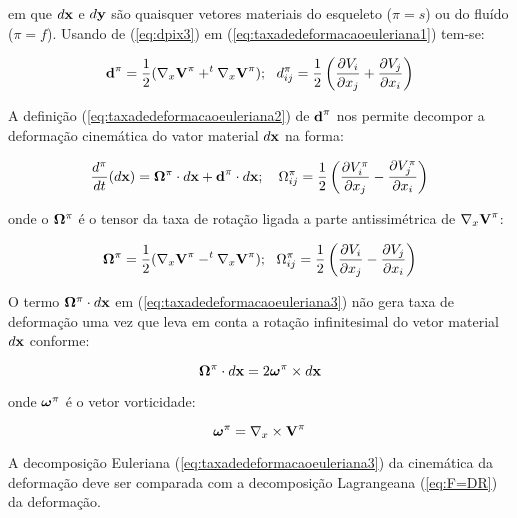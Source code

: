 \documentclass[
	11pt, %
	fleqn, %
	a4paper, %
]{LegrandOrangeBook}
\begin{document}
em que $d\textbf{x}$ e $d\textbf{y}$ são quaisquer vetores materiais do esqueleto ($\pi = s$) ou do fluído ($\pi = f$). Usando de (\ref{eq:dpix3}) em (\ref{eq:taxadedeformacaoeuleriana1}) tem-se: 

\begin{equation}
	\label{eq:taxadedeformacaoeuleriana2}	
\textbf{d}^{\pi} = \dfrac{1}{2}(\nabla_x \textbf{V}^{\pi} + ^{t}\nabla_x \textbf{V}^{\pi}); ~~ d^\pi_{ij} =  \dfrac{1}{2} \left(\dfrac{\partial V_i}{\partial x_j} + \dfrac{\partial V_j}{\partial x_i}\right)
\end{equation}

A definição (\ref{eq:taxadedeformacaoeuleriana2}) de $\textbf{d}^{\pi}$ nos permite decompor a deformação cinemática do vator material $d\textbf{x}$ na forma:

\begin{equation}
	\label{eq:taxadedeformacaoeuleriana3}	
	\dfrac{d^\pi}{dt}(d\textbf{x}) = \bm{\Omega}^\pi \cdot d\textbf{x} + \textbf{d}^\pi \cdot d\textbf{x}; ~~~ \Omega^\pi_{ij} = \dfrac{1}{2}\left(\dfrac{\partial V_i^\pi}{\partial x_j}-\dfrac{\partial V_j^\pi}{\partial x_i} \right)
\end{equation}

onde o $\bm{\Omega}^\pi$ é o tensor da taxa de rotação ligada a parte antissimétrica de $\nabla_x \textbf{V}^\pi$:

\begin{equation}
	\label{eq:taxadedeformacaoeuleriana4}	
\bm{\Omega}^\pi = \dfrac{1}{2}(\nabla_x \textbf{V}^{\pi} - ^{t}\nabla_x \textbf{V}^{\pi}); ~~ \Omega^\pi_{ij} =  \dfrac{1}{2} \left(\dfrac{\partial V_i}{\partial x_j} - \dfrac{\partial V_j}{\partial x_i}\right)
\end{equation}

O termo $\bm{\Omega}^\pi \cdot d\textbf{x}$ em (\ref{eq:taxadedeformacaoeuleriana3}) não gera taxa de deformação uma vez que leva em conta a rotação infinitesimal do vetor material $d\textbf{x}$ conforme:

\begin{equation}
	\label{eq:taxadedeformacaoeuleriana5}	
	\bm{\Omega}^\pi \cdot d\textbf{x} = 2 \bm{\omega}^\pi \times d\textbf{x}
\end{equation}

onde $\bm{\omega}^\pi$ é o vetor vorticidade:

\begin{equation}
	\label{eq:vetorvorticidade}	
	\bm{\omega}^\pi = \nabla_x \times \textbf{V}^\pi
\end{equation}

A decomposição Euleriana (\ref{eq:taxadedeformacaoeuleriana3}) da cinemática da deformação deve ser comparada com a decomposição Lagrangeana (\ref{eq:F=DR}) da deformação.
\end{document}
